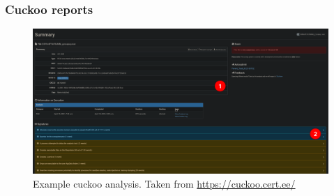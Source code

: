 \documentclass[10pt,xcolor=pdflatex]{beamer}
\begin{document}
\begin{frame}\frametitle{Cuckoo reports}

    \begin{figure}
      \centering
      \includegraphics[width=.8\textwidth]{../images/cuckoo.png}
      \caption{Example cuckoo analysis. \tiny Taken from \url{https://cuckoo.cert.ee/}}
    \end{figure}

\end{frame}
\end{document}

